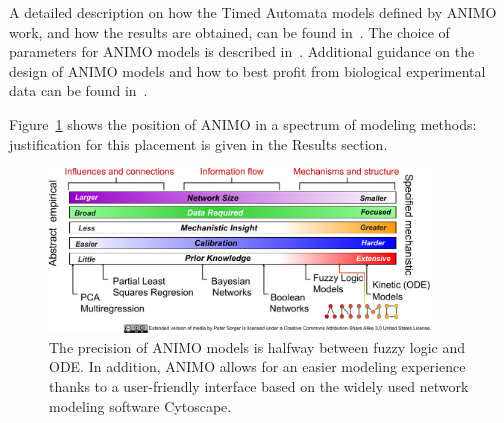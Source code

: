 \documentclass{bmcart}
\begin{document}
A detailed description on how the Timed Automata models defined by ANIMO work, and how the results are obtained,
can be found in~\cite{animo-ieee}. The choice of parameters for ANIMO models is described in~\cite{animo-syncop}.
Additional guidance on the design of ANIMO models and how to best profit from biological experimental data can be found in~\cite{animo-gene}.

Figure~\ref{fig:animo-spectrum} shows the position of ANIMO in a spectrum of modeling methods: justification for this placement is given in the Results section.



\begin{figure}[htbp]
 \begin{center}
  \includegraphics[width=0.9\textwidth]{images/modeling_methods_spectrum_animo}
 \end{center}
\caption{
The precision of ANIMO models is halfway between fuzzy logic and ODE. In addition, ANIMO
allows for an easier modeling experience thanks to a user-friendly interface based on
the widely used network modeling software Cytoscape.\label{fig:animo-spectrum}}
\end{figure}
\end{document}
